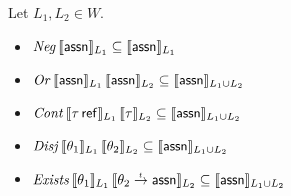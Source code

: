 \documentclass[12pt,a4paper]{report}
\newcommand{\Neg}{\nstyle{Neg}}
\newcommand{\Or}{\nstyle{Or}}
\newcommand{\Cont}{\nstyle{Cont}}
\newcommand{\Disj}{\nstyle{Disj}}
\newcommand{\Exists}{\nstyle{Exists}}
\begin{document}
\begin{lemma}
  Let $L_1,L_2 \in W$.
  \begin{itemize}
    \item $\Neg\,\semantic{\tassn}_{L_1} \subseteq \semantic{\tassn}_{L_1}$
    \item $\Or\,\semantic{\tassn}_{L_1}\,\semantic{\tassn}_{L_2} \subseteq \semantic{\tassn}_{L_1 \cup L_2}$
    \item $\Cont\,\semantic{\tref{\tau}}_{L_1}\,\semantic{\tau}_{L_2} \subseteq \semantic{\tassn}_{L_1 \cup L_2}$
    \item $\Disj\,\semantic{\theta_1}_{L_1}\,\semantic{\theta_2}_{L_2} \subseteq \semantic{\tassn}_{L_1\cup L_2}$
    \item $\Exists\,\semantic{\theta_1}_{L_1}\,\semantic{\ttarrow{\theta_2}{\tassn}}_{L_2}
            \subseteq \semantic{\tassn}_{L_1 \cup L_2}$
  \end{itemize}
\end{lemma}
\end{document}
